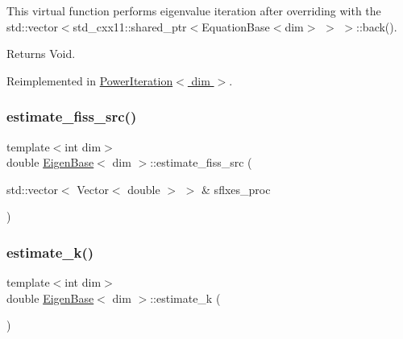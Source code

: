 This virtual function performs eigenvalue iteration after overriding with the std\+::vector$<$std\+\_\+cxx11\+::shared\+\_\+ptr$<$Equation\+Base$<$dim$>$ $>$ $>$\+::back().

\begin{DoxyReturn}{Returns}
Void. 
\end{DoxyReturn}


Reimplemented in \hyperlink{class_power_iteration_a583586002126f8b7a523e95327047cba}{Power\+Iteration$<$ dim $>$}.

\mbox{\label{class_eigen_base_ae733df97cbb04ca2e8a2568acdf9f222}} 
\subsubsection{\texorpdfstring{estimate\+\_\+fiss\+\_\+src()}{estimate\_fiss\_src()}}
{\footnotesize\ttfamily template$<$int dim$>$ \\
double \hyperlink{class_eigen_base}{Eigen\+Base}$<$ dim $>$\+::estimate\+\_\+fiss\+\_\+src (\begin{DoxyParamCaption}\item[{std\+::vector$<$ Vector$<$ double $>$ $>$ \&}]{sflxes\+\_\+proc }\end{DoxyParamCaption})\hspace{0.3cm}{\ttfamily [protected]}}

\mbox{\label{class_eigen_base_a1ad5ce67d3534960731d34691db2f4d9}} 
\subsubsection{\texorpdfstring{estimate\+\_\+k()}{estimate\_k()}}
{\footnotesize\ttfamily template$<$int dim$>$ \\
double \hyperlink{class_eigen_base}{Eigen\+Base}$<$ dim $>$\+::estimate\+\_\+k (\begin{DoxyParamCaption}{ }\end{DoxyParamCaption})\hspace{0.3cm}{\ttfamily [protected]}}

\mbox{\label{class_eigen_base_ac9b7836c98e95a8be4d57b3ccf11f185}} 
